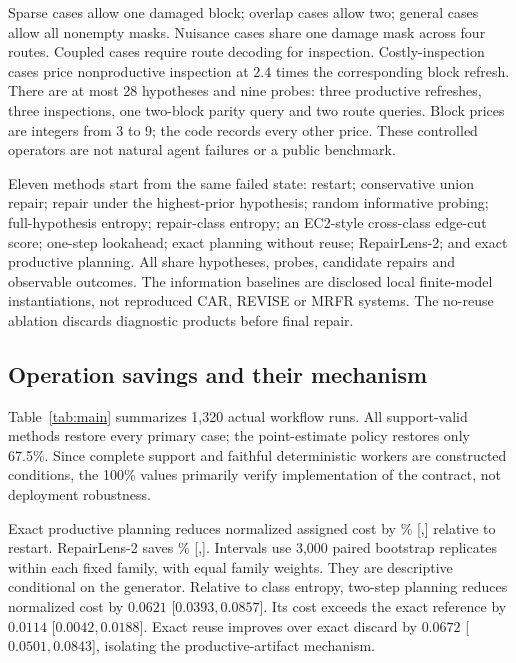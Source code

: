 \documentclass[10pt,letterpaper]{article}
\begin{document}
Sparse cases allow one damaged block; overlap cases allow two; general cases allow all nonempty masks. Nuisance cases share one damage mask across four routes. Coupled cases require route decoding for inspection. Costly-inspection cases price nonproductive inspection at $2.4$ times the corresponding block refresh. There are at most 28 hypotheses and nine probes: three productive refreshes, three inspections, one two-block parity query and two route queries. Block prices are integers from 3 to 9; the code records every other price. These controlled operators are not natural agent failures or a public benchmark.

Eleven methods start from the same failed state: restart; conservative union repair; repair under the highest-prior hypothesis; random informative probing; full-hypothesis entropy; repair-class entropy; an EC2-style cross-class edge-cut score; one-step lookahead; exact planning without reuse; RepairLens-2; and exact productive planning. All share hypotheses, probes, candidate repairs and observable outcomes. The information baselines are disclosed local finite-model instantiations, not reproduced CAR, REVISE or MRFR systems. The no-reuse ablation discards diagnostic products before final repair.

\begin{table}[t]
\centering
\caption{120 cases per policy. Complete is a percentage; cost is normalized by each case's restart cost. Planning time is measured, not assigned.}
\label{tab:main}
{\fontsize{9}{11}\selectfont\setlength{\tabcolsep}{2.5pt}}
\end{table}

\subsection{Operation savings and their mechanism}
Table~\ref{tab:main} summarizes 1,320 actual workflow runs. All support-valid methods restore every primary case; the point-estimate policy restores only 67.5\%. Since complete support and faithful deterministic workers are constructed conditions, the 100\% values primarily verify implementation of the contract, not deployment robustness.

Exact productive planning reduces normalized assigned cost by \RLExactSaving\% [\RLLowExact,\RLHighExact] relative to restart. RepairLens-2 saves \RLTwoSaving\% [\RLLowTwo,\RLHighTwo]. Intervals use 3,000 paired bootstrap replicates within each fixed family, with equal family weights. They are descriptive conditional on the generator. Relative to class entropy, two-step planning reduces normalized cost by $0.0621$ [$0.0393,0.0857$]. Its cost exceeds the exact reference by $0.0114$ [$0.0042,0.0188$]. Exact reuse improves over exact discard by $0.0672$ [$0.0501,0.0843$], isolating the productive-artifact mechanism.
\end{document}
